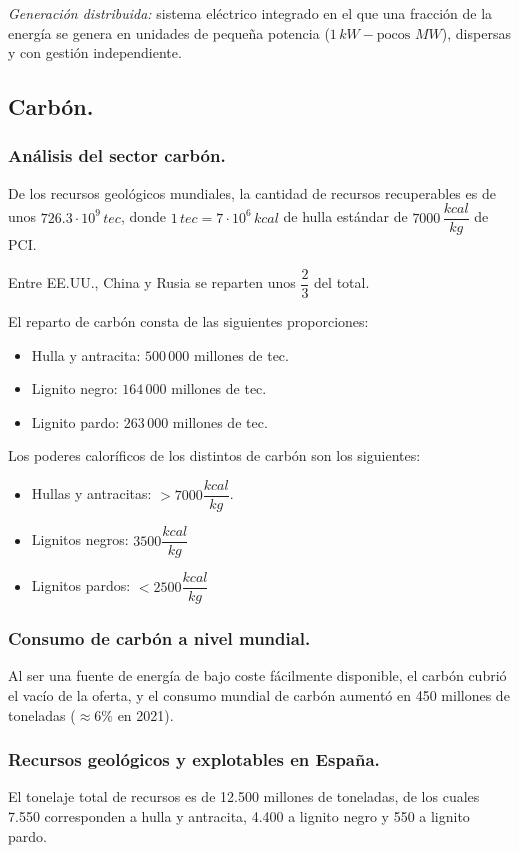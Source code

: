 			
			\textit{Generación distribuida:} sistema eléctrico integrado en el que una fracción de la energía se genera en unidades de pequeña potencia ($1\,kW-\text{pocos }MW$), dispersas y con gestión independiente.
			
			
	\subsection{Carbón.}
		\subsubsection{Análisis del sector carbón.}
			De los recursos geológicos mundiales, la cantidad de recursos recuperables es de unos $726.3\cdot 10^9\,tec$, donde $1\,tec = 7\cdot 10^6\,kcal$ de hulla estándar de $7000\,\dfrac{kcal}{kg}$ de PCI.
			
			
			Entre EE.UU., China y Rusia se reparten unos $\dfrac{2}{3}$ del total. 
			
			
			El reparto de carbón consta de las siguientes proporciones:
			\begin{itemize}
				\item Hulla y antracita: $500\,000$ millones de tec.
				\item Lignito negro: $164\,000$ millones de tec.
				\item Lignito pardo: $263\,000$ millones de tec.
			\end{itemize}
			
			Los poderes caloríficos de los distintos de carbón son los siguientes:
			\begin{itemize}
				\item Hullas y antracitas: $>7000\dfrac{kcal}{kg}$.
				\item Lignitos negros: $3500\dfrac{kcal}{kg}$
				\item Lignitos pardos: $<2500\dfrac{kcal}{kg}$
			\end{itemize}
			
		\subsubsection{Consumo de carbón a nivel mundial.}
			Al ser una fuente de energía de bajo
			coste fácilmente disponible, el carbón
			cubrió el vacío de la oferta, y el
			consumo mundial de carbón aumentó
			en 450 millones de toneladas ($\approx$6\% en 2021).
			
		\subsubsection{Recursos geológicos y explotables en España.}
			El tonelaje total de recursos es de 12.500 millones de toneladas, de los cuales 7.550 corresponden a
			hulla y antracita, 4.400 a lignito negro y 550 a lignito pardo.
			
